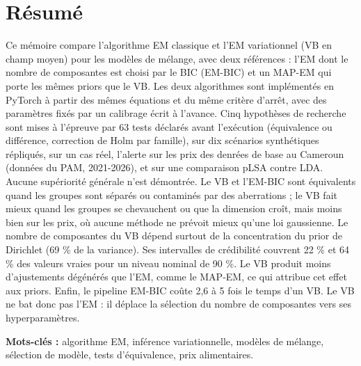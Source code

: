 
\chapter*{Résumé}
Ce mémoire compare l'algorithme EM classique et l'EM variationnel (VB en champ moyen) pour les modèles de mélange, avec deux références : l'EM dont le nombre de composantes est choisi par le BIC (EM-BIC) et un MAP-EM qui porte les mêmes priors que le VB. Les deux algorithmes sont implémentés en PyTorch à partir des mêmes équations et du même critère d'arrêt, avec des paramètres fixés par un calibrage écrit à l'avance. Cinq hypothèses de recherche sont mises à l'épreuve par 63 tests déclarés avant l'exécution (équivalence ou différence, correction de Holm par famille), sur dix scénarios synthétiques répliqués, sur un cas réel, l'alerte sur les prix des denrées de base au Cameroun (données du PAM, 2021-2026), et sur une comparaison pLSA contre LDA. Aucune supériorité générale n'est démontrée. Le VB et l'EM-BIC sont équivalents quand les groupes sont séparés ou contaminés par des aberrations ; le VB fait mieux quand les groupes se chevauchent ou que la dimension croît, mais moins bien sur les prix, où aucune méthode ne prévoit mieux qu'une loi gaussienne. Le nombre de composantes du VB dépend surtout de la concentration du prior de Dirichlet (69 \% de la variance). Ses intervalles de crédibilité couvrent 22 \% et 64 \% des valeurs vraies pour un niveau nominal de 90 \%. Le VB produit moins d'ajustements dégénérés que l'EM, comme le MAP-EM, ce qui attribue cet effet aux priors. Enfin, le pipeline EM-BIC coûte 2,6 à 5 fois le temps d'un VB. Le VB ne bat donc pas l'EM : il déplace la sélection du nombre de composantes vers ses hyperparamètres.

\medskip
\noindent\textbf{Mots-clés :} algorithme EM, inférence variationnelle, modèles de mélange, sélection de modèle, tests d'équivalence, prix alimentaires.

